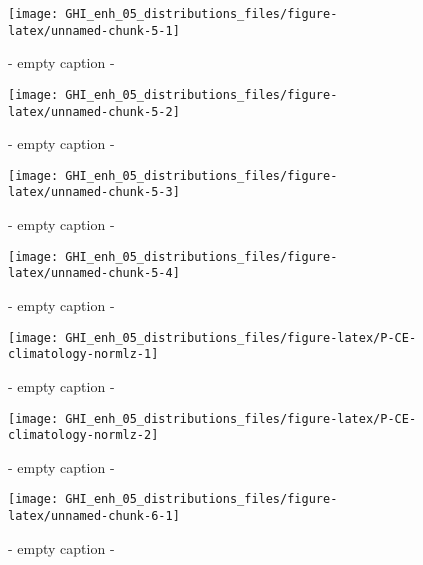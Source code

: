 \documentclass[
  10pt,
  a4paper,oneside]{article}
\begin{document}
\begin{figure}[H]

{\centering \texttt{[image: GHI\_enh\_05\_distributions\_files/figure-latex/unnamed-chunk-5-1]} 

}

\caption{ - empty caption - }\label{fig:unnamed-chunk-5-1}
\end{figure}
\begin{figure}[H]

{\centering \texttt{[image: GHI\_enh\_05\_distributions\_files/figure-latex/unnamed-chunk-5-2]} 

}

\caption{ - empty caption - }\label{fig:unnamed-chunk-5-2}
\end{figure}
\begin{figure}[H]

{\centering \texttt{[image: GHI\_enh\_05\_distributions\_files/figure-latex/unnamed-chunk-5-3]} 

}

\caption{ - empty caption - }\label{fig:unnamed-chunk-5-3}
\end{figure}
\begin{figure}[H]

{\centering \texttt{[image: GHI\_enh\_05\_distributions\_files/figure-latex/unnamed-chunk-5-4]} 

}

\caption{ - empty caption - }\label{fig:unnamed-chunk-5-4}
\end{figure}
\begin{figure}[H]

{\centering \texttt{[image: GHI\_enh\_05\_distributions\_files/figure-latex/P-CE-climatology-normlz-1]} 

}

\caption{ - empty caption - }\label{fig:P-CE-climatology-normlz-1}
\end{figure}
\begin{figure}[H]

{\centering \texttt{[image: GHI\_enh\_05\_distributions\_files/figure-latex/P-CE-climatology-normlz-2]} 

}

\caption{ - empty caption - }\label{fig:P-CE-climatology-normlz-2}
\end{figure}
\begin{figure}[H]

{\centering \texttt{[image: GHI\_enh\_05\_distributions\_files/figure-latex/unnamed-chunk-6-1]} 

}

\caption{ - empty caption - }\label{fig:unnamed-chunk-6-1}
\end{figure}
\end{document}
